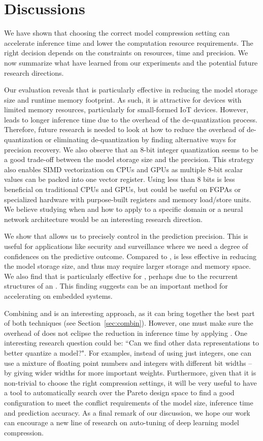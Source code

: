 \section{Discussions}
We have shown that choosing the correct model compression setting can accelerate inference time and lower the computation resource
requirements. The right decision depends on the constraints on resources, time and precision. We now summarize what have learned from our
experiments and the potential future research directions.

Our evaluation reveals that \dquantization is particularly effective in reducing the model storage size and runtime memory footprint. As
such, it is attractive for devices with limited memory resources, particularly for small-formed IoT devices. However, \quantization leads
to longer inference time due to the overhead of the de-quantization process. Therefore, future research is needed to look at how to reduce
the overhead of de-quantization or eliminating de-quantization by finding alternative ways for precision recovery. We also observe that an
8-bit integer quantization seems to be a good trade-off between the model storage size and the precision. This strategy also enables SIMD
vectorization on CPUs and GPUs as multiple 8-bit scalar values can be packed into one vector register. Using less than 8 bits is less
beneficial on traditional CPUs and GPUs, but could be useful on FGPAs or specialized hardware with purpose-built registers and memory
load/store units. We believe studying when and how to apply \dquantization to a specific domain or a neural network architecture would be
an interesting research direction.

We show that \pruning allows us to precisely control in the prediction precision. This is useful for applications like security and
surveillance where we need a degree of confidences on the predictive outcome. Compared to \dquantization, \pruning is less effective in
reducing the model storage size, and thus may require larger storage and memory space. We also find that \pruning is particularly effective
for \RNNs, perhaps due to the recurrent structures of an \RNN. This finding suggests \pruning can be an important method for accelerating
\RNN on embedded systems.

Combining \dquantization and \pruning is an interesting approach, as it can bring together the best part of both techniques (see
Section~\ref{sec:combin}). However, one must  make sure the overhead of \dquantization does not eclipse the reduction in inference time by
applying \pruning. One interesting research question could be: ``Can we find other data representations to better quantize a model?". For
examples, instead of using just integers, one can use a mixture of floating point numbers and integers with different bit widths – by
giving wider widths for more important weights. Furthermore, given that it is non-trivial to choose the right compression settings, it will
be very useful to have a tool to automatically search over the Pareto design space to find a good configuration to meet the conflict
requirements of the model size, inference time and prediction accuracy.  As a final remark of our discussion, we hope our work can
encourage a new line of research on auto-tuning of deep learning model compression.
